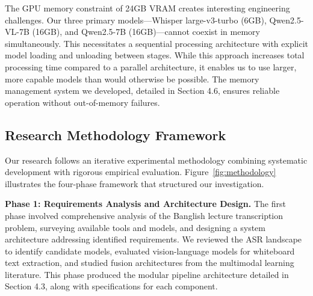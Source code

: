 The GPU memory constraint of 24GB VRAM creates interesting engineering challenges. Our three primary models---Whisper large-v3-turbo (6GB), Qwen2.5-VL-7B (16GB), and Qwen2.5-7B (16GB)---cannot coexist in memory simultaneously. This necessitates a sequential processing architecture with explicit model loading and unloading between stages. While this approach increases total processing time compared to a parallel architecture, it enables us to use larger, more capable models than would otherwise be possible. The memory management system we developed, detailed in Section 4.6, ensures reliable operation without out-of-memory failures.

\subsection{Research Methodology Framework}

Our research follows an iterative experimental methodology combining systematic development with rigorous empirical evaluation. Figure~\ref{fig:methodology} illustrates the four-phase framework that structured our investigation.

%
%

\textbf{Phase 1: Requirements Analysis and Architecture Design.} The first phase involved comprehensive analysis of the Banglish lecture transcription problem, surveying available tools and models, and designing a system architecture addressing identified requirements. We reviewed the ASR landscape to identify candidate models, evaluated vision-language models for whiteboard text extraction, and studied fusion architectures from the multimodal learning literature. This phase produced the modular pipeline architecture detailed in Section 4.3, along with specifications for each component.

